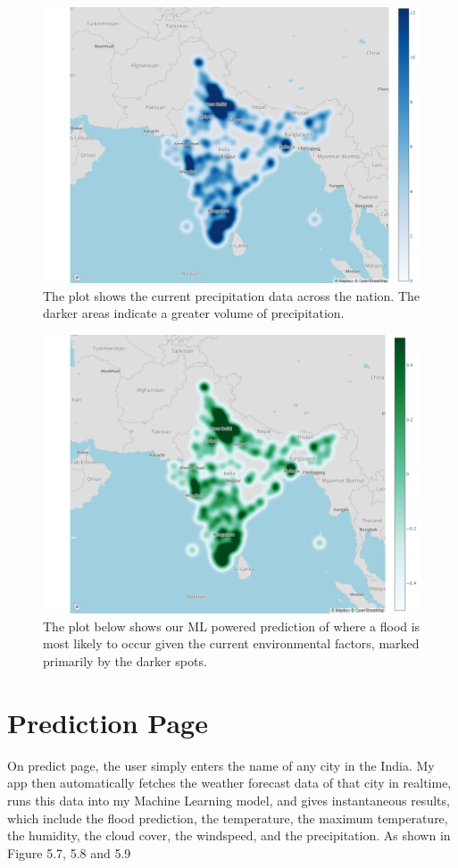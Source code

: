 \documentclass[a4paper,12pt]{report}
\begin{document}
\begin{figure}[ht]
  \centering
  \includegraphics[width=\linewidth]{heatmap2.png}
  \caption{The plot shows the current precipitation data across the nation. The darker areas indicate a greater volume of precipitation.}
\end{figure}

\begin{figure}[ht]
  \centering
  \includegraphics[width=\linewidth]{heatmap3.png}
  \caption{The plot below shows our ML powered prediction of where a flood is most likely to occur given the current environmental factors, marked primarily by the darker spots.}
\end{figure}

\section{Prediction Page}
On predict page, the user simply enters the name of any city in the India. My app then automatically fetches the weather forecast data of that city in realtime, runs this data into my Machine Learning model, and gives instantaneous results, which include the flood prediction, the temperature, the maximum temperature, the humidity, the cloud cover, the windspeed, and the precipitation. As shown in Figure 5.7, 5.8 and 5.9
\end{document}
